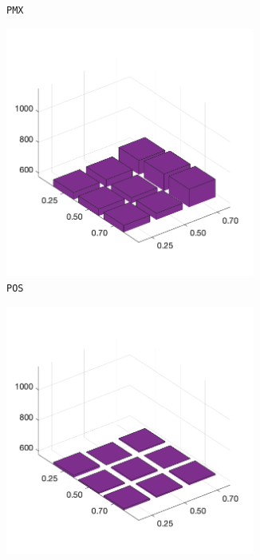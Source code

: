\begin{figure}[H]
\begin{subfigure}[b]{0.25\textwidth}
		\caption{\texttt{PMX}}
		\label{fig:z}
    	\end{subfigure}
%
	\begin{subfigure}[b]{0.25\textwidth}
		\centering
		\includegraphics[width=0.9\textwidth]{crossover/min/cross_position_based_4.png}
		\caption{\texttt{POS}}
		\label{fig:x}
    	\end{subfigure}
%
	\begin{subfigure}[b]{0.25\textwidth}
		\centering
		\includegraphics[width=0.9\textwidth]{crossover/min/cross_seq_constructive_4.png}

\end{subfigure}
\end{figure}
